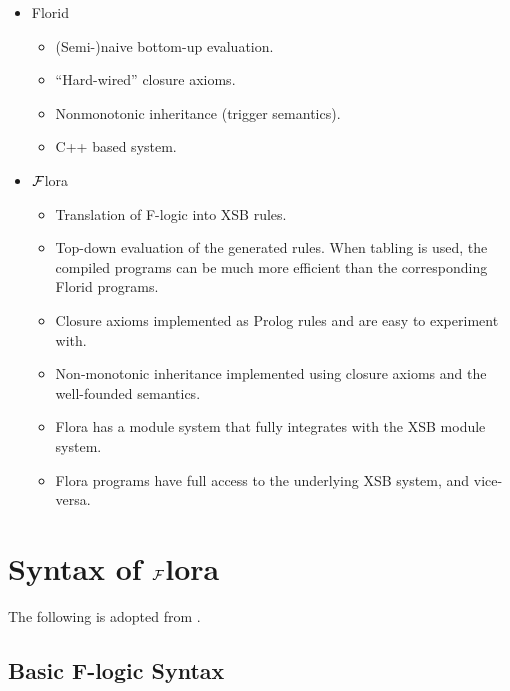 \documentclass[11pt]{article}
\newcommand{\FLORA}{{\mbox{${\cal F}${\sc lora}}}\xspace}
\newcommand{\FLORID}{{\mbox{\sc Florid}}\xspace}
\newcommand{\fl}{{F-logic}\xspace}
\begin{document}
\begin{itemize}
\item \FLORID
  \begin{itemize}
  \item (Semi-)naive bottom-up evaluation.
  \item ``Hard-wired'' closure axioms.
  \item Nonmonotonic inheritance (trigger semantics).
  \item C++ based system.
  \end{itemize}
\item \FLORA
  \begin{itemize}
  \item Translation of \fl into XSB rules.
  \item Top-down evaluation of the generated rules. When tabling is used,
    the compiled programs can be much more efficient than the corresponding
    \FLORID programs.
  \item Closure axioms implemented as Prolog rules and are easy to
    experiment with.
  \item Non-monotonic inheritance implemented using closure axioms and the
    well-founded semantics.
  \item Flora has a module system that fully integrates with the XSB module
    system.
  \item Flora programs have full access to the underlying XSB system, and
    vice-versa.
  \end{itemize}
\end{itemize}



\section{Syntax of \FLORA}

The following is adopted from \cite{ludaescher-himmeroeder-IS-98}.


\subsection{Basic F-logic Syntax}\label{sec-basic-flogic}
\end{document}
